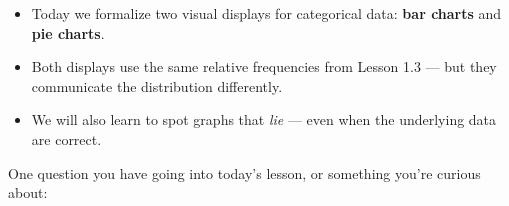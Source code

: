 \documentclass[10pt]{article}
\begin{document}
\vspace{0.12in}

\begin{tcolorbox}[colback=greenbg, colframe=greenacc, boxrule=0.8pt, arc=2mm,
    left=4mm, right=4mm, top=3mm, bottom=3mm]
\small
\begin{itemize}[leftmargin=1.3em, itemsep=5pt]
  \item Today we formalize two visual displays for categorical data:
        \textbf{bar charts} and \textbf{pie charts}.
  \item Both displays use the same relative frequencies from Lesson 1.3 ---
        but they communicate the distribution differently.
  \item We will also learn to spot graphs that \textit{lie} --- even when the
        underlying data are correct.
\end{itemize}
\end{tcolorbox}

\vspace{0.12in}

\noindent\textcolor{slate}{\small One question you have going into today's lesson,
or something you're curious about:}\\[8pt]
\writeline
\end{document}
